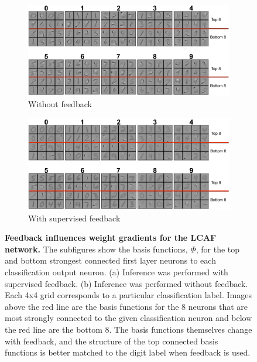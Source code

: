 \begin{figure}
    \centering
    \begin{subfigure}[b]{0.9\textwidth}
        \centering
        \includegraphics[width=\textwidth]{figures/lca_nofeedback_classifier_features.png}
        \caption{Without feedback}
        \label{fig:ch3_nofeedback_features}
    \end{subfigure}
    \begin{subfigure}[b]{0.9\textwidth}
        \centering
        \includegraphics[width=\textwidth]{figures/lca_feedback_classifier_features.png}
        \caption{With supervised feedback}
        \label{fig:ch3_feedback_features}
    \end{subfigure}
    \caption{\textbf{Feedback influences weight gradients for the LCAF network.} The subfigures show the basis functions, $\Phi$, for the top and bottom strongest connected first layer neurons to each classification output neuron. (a) Inference was performed with supervised feedback. (b) Inference was performed without feedback. Each 4x4 grid corresponds to a particular classification label. Images above the red line are the basis functions for the 8 neurons that are most strongly connected to the given classification neuron and below the red line are the bottom 8. The basis functions themselves change with feedback, and the structure of the top connected basis functions is better matched to the digit label when feedback is used.}
    \label{fig:ch3_feedback_nofeedback_features}
\end{figure}

